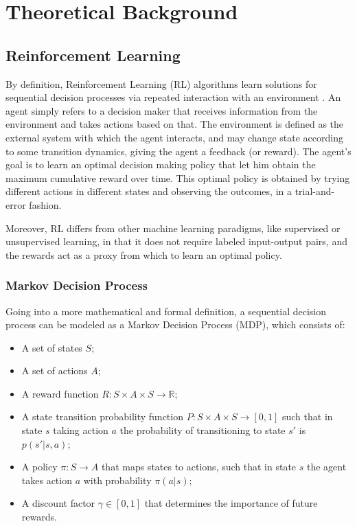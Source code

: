 \chapter{Theoretical Background}

\section{Reinforcement Learning}

By definition, Reinforcement Learning (RL) algorithms learn solutions for sequential decision processes via 
repeated interaction with an environment \cite{albrecht2024multi}. An agent simply refers 
to a decision maker that receives information from the environment and takes actions based
on that. The environment is defined as the external system with which the agent interacts, 
and may change state according to some transition dynamics, giving the agent a feedback (or reward).
The agent's goal is to learn an optimal decision making policy that let him obtain 
the maximum cumulative reward over time. This optimal policy is obtained by trying 
different actions in different states and observing the outcomes, in a trial-and-error fashion.

Moreover, RL differs from other machine learning paradigms, like supervised or unsupervised learning, 
in that it does not require labeled input-output pairs, and the rewards act as a proxy from which to learn 
an optimal policy.

\subsection{Markov Decision Process}

Going into a more mathematical and formal definition, a sequential decision process 
can be modeled as a Markov Decision Process (MDP), which consists of:
\begin{itemize}
    \item A set of states $S$;
    \item A set of actions $A$;
    \item A reward function $R : S\times A\times S \to \mathbb{R}$;
    \item A state transition probability function $P : S\times A\times S \to [0,1]$ such that in state $s$ taking action $a$ the probability of transitioning to state $s'$ is $p(s'|s,a)$;
    \item A policy $\pi : S \to A$ that maps states to actions, such that in state $s$ the agent takes action $a$ with probability $\pi(a|s)$;
    \item A discount factor $\gamma \in [0,1]$ that determines the importance of future rewards.
\end{itemize}

